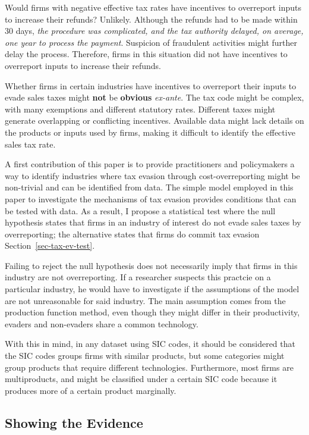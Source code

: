\documentclass[
  12pt]{article}
\theoremstyle{definition}
\theoremstyle{remark}
\begin{document}
Would firms with negative effective tax rates have incentives to
overreport inputs to increase their refunds? Unlikely. Although the
refunds had to be made within 30 days, \emph{the procedure was
complicated, and the tax authority delayed, on average, one year to
process the payment}. Suspicion of fraudulent activities might further
delay the process. Therefore, firms in this situation did not have
incentives to overreport inputs to increase their refunds.

Whether firms in certain industries have incentives to overreport their
inputs to evade sales taxes might \textbf{not} be \textbf{obvious}
\emph{ex-ante}. The tax code might be complex, with many exemptions and
different statutory rates. Different taxes might generate overlapping or
conflicting incentives. Available data might lack details on the
products or inputs used by firms, making it difficult to identify the
effective sales tax rate.

A first contribution of this paper is to provide practitioners and
policymakers a way to identify industries where tax evasion through
cost-overreporting might be non-trivial and can be identified from data.
The simple model employed in this paper to investigate the mechanisms of
tax evasion provides conditions that can be tested with data. As a
result, I propose a statistical test where the null hypothesis states
that firms in an industry of interest do not evade sales taxes by
overreporting; the alternative states that firms do commit tax evasion
Section~\ref{sec-tax-ev-test}.

Failing to reject the null hypothesis does not necessarily imply that
firms in this industry are not overreporting. If a researcher suspects
this practcie on a particular industry, he would have to investigate if
the assumptions of the model are not unreasonable for said industry. The
main assumption comes from the production function method, even though
they might differ in their productivity, evaders and non-evaders share a
common technology.

With this in mind, in any dataset using SIC codes, it should be
considered that the SIC codes groups firms with similar products, but
some categories might group products that require different
technologies. Furthermore, most firms are multiproducts, and might be
classified under a certain SIC code because it produces more of a
certain product marginally.

\subsection{Showing the Evidence}\label{showing-the-evidence}
\end{document}
